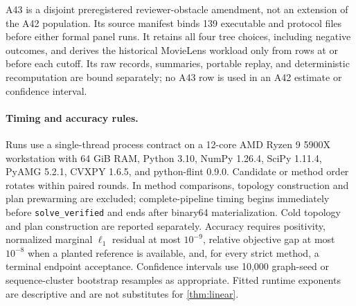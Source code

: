 \documentclass[smallextended,envcountsect]{svjour3}
\begin{document}
A43 is a disjoint preregistered reviewer-obstacle amendment, not an extension of
the A42 population.  Its source manifest binds 139 executable and protocol
files before either formal panel runs.  It retains all four tree choices,
including negative outcomes, and derives the historical MovieLens workload
only from rows at or before each cutoff.  Its raw records, summaries, portable
replay, and deterministic recomputation are bound separately; no A43 row is
used in an A42 estimate or confidence interval.

\paragraph{Timing and accuracy rules.}
Runs use a single-thread process contract on a 12-core AMD Ryzen 9 5900X
workstation with 64 GiB RAM, Python 3.10, NumPy 1.26.4, SciPy 1.11.4,
PyAMG 5.2.1, CVXPY 1.6.5, and python-flint 0.9.0.  Candidate or method order
rotates within paired rounds.  In method comparisons, topology construction and
plan prewarming are excluded; complete-pipeline timing begins immediately before
\texttt{solve\_verified} and ends after binary64 materialization.  Cold topology
and plan construction are reported separately.  Accuracy requires positivity,
normalized marginal $\ell_1$ residual at most $10^{-9}$, relative objective gap
at most $10^{-8}$ when a planted reference is available, and, for every strict
method, a terminal endpoint acceptance.  Confidence intervals use 10,000
graph-seed or sequence-cluster bootstrap resamples as appropriate.  Fitted
runtime exponents are descriptive and are not substitutes for
\cref{thm:linear}.
\end{document}
